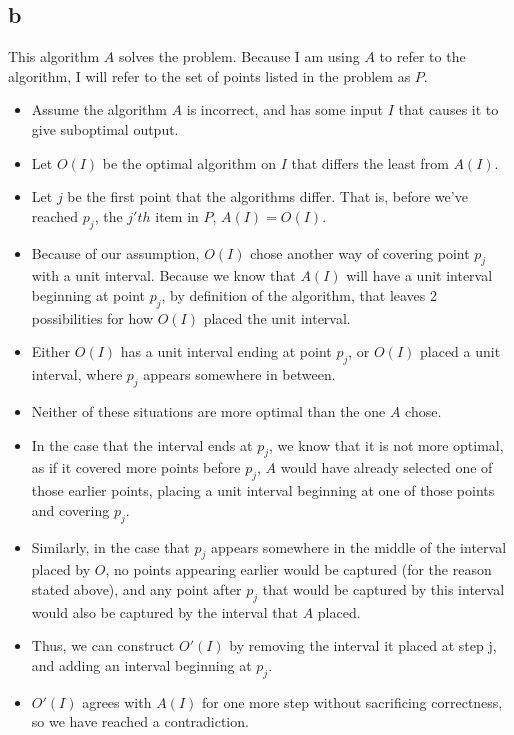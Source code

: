\documentclass[letterpaper,notitlepage,twoside]{article}
\begin{document}
\subsection*{b}
This algorithm $A$ solves the problem. Because I am using $A$ to refer to the algorithm, I will refer to the set of points listed in the problem as $P$. 
\begin{itemize}
	\item Assume the algorithm $A$ is incorrect, and has some input $I$ that causes it to give suboptimal output. 
	\item Let $O(I)$ be the optimal algorithm on $I$ that differs the least from $A(I)$. 
	\item Let $j$ be the first point that the algorithms differ. That is, before we've reached $p_j$, the $j'th$ item in $P$, $A(I)=O(I)$. 
	\item Because of our assumption, $O(I)$ chose another way of covering point $p_j$ with a unit interval. Because we know that $A(I)$ will have a unit interval beginning at point $p_j$, by definition of the algorithm, that leaves 2 possibilities for how $O(I)$ placed the unit interval. 
	\item Either $O(I)$ has a unit interval ending at point $p_j$, or $O(I)$ placed a unit interval, where $p_j$ appears somewhere in between. 
	\item Neither of these situations are more optimal than the one $A$ chose. 
	\item In the case that the interval ends at $p_j$, we know that it is not more optimal, as if it covered more points before $p_j$, $A$ would have already selected one of those earlier points, placing a unit interval beginning at one of those points and covering $p_j$. 
	\item Similarly, in the case that $p_j$ appears somewhere in the middle of the interval placed by $O$, no points appearing earlier would be captured (for the reason stated above), and any point after $p_j$ that would be captured by this interval would also be captured by the interval that $A$ placed.
	\item Thus, we can construct $O'(I)$ by removing the interval it placed at step j, and adding an interval beginning at $p_j$. 
	\item $O'(I)$ agrees with $A(I)$ for one more step without sacrificing correctness, so we have reached a contradiction. 
\end{itemize}	
\end{document}
